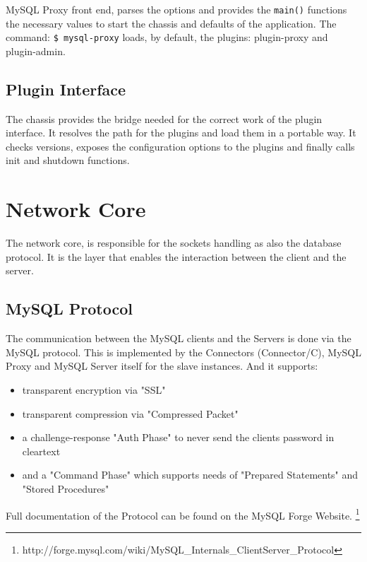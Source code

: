 MySQL Proxy front end, parses the options and provides the \texttt{main()} functions the necessary values to start the chassis and defaults of the application. The command: \texttt{\$ mysql\--proxy} loads, by default, the plugins: plugin-proxy and plugin-admin.


\subsection{Plugin Interface}

The chassis provides the bridge needed for the correct work of the plugin interface. It resolves the path for the plugins and load them in a portable way. 
It checks versions, exposes the configuration options to the plugins and finally calls init and shutdown functions. %

\section{Network Core}

The network core, is responsible for the sockets handling as also the database protocol. It is the layer that enables the interaction between the client and the server.

\subsection{MySQL Protocol}

The communication between the MySQL clients and the Servers is done via the MySQL protocol. This is implemented by the Connectors (Connector/C), MySQL Proxy and MySQL Server itself for the slave instances. And it supports:

\begin{itemize}
	\item transparent encryption via "SSL"
	\item transparent compression via "Compressed Packet"
	\item a challenge-response "Auth Phase" to never send the clients password in cleartext
	\item and a "Command Phase" which supports needs of "Prepared Statements" and "Stored Procedures"
\end{itemize}

Full documentation of the Protocol can be found on the MySQL Forge Website. \footnote{http://forge.mysql.com/wiki/MySQL\_Internals\_ClientServer\_Protocol}


